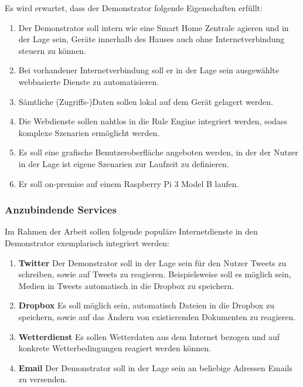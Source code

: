 Es wird erwartet, dass der Demonstrator folgende Eigenschaften erfüllt:
\begin{enumerate}

\item Der Demonstrator soll intern wie eine Smart Home Zentrale agieren und in der Lage sein, Geräte innerhalb des Hauses auch ohne Internetverbindung steuern zu können.
\item Bei vorhandener Internetverbindung soll er in der Lage sein ausgewählte  webbasierte Dienste zu automatisieren.
\item Sämtliche (Zugriffs-)Daten sollen lokal auf dem Gerät gelagert werden. 
\item Die Webdienste sollen nahtlos in die Rule Engine integriert werden, sodass komplexe Szenarien ermöglicht werden.
\item Es soll eine grafische Benutzeroberfläche angeboten werden, in der der Nutzer in der Lage ist eigene Szenarien zur Laufzeit zu definieren.
\item Er soll on-premise auf einem Raspberry Pi 3 Model B laufen.

\end{enumerate}

\subsubsection{Anzubindende Services}
\label{subsec:anzubindende_services}
Im Rahmen der Arbeit sollen folgende populäre Internetdienste in den Demonstrator exemplarisch integriert werden:
\begin{enumerate}
\item \textbf{Twitter}\cite{twitter} Der Demonstrator soll in der Lage sein für den Nutzer Tweets zu schreiben, sowie auf Tweets zu reagieren. Beispielsweise soll es möglich sein, Medien in Tweets automatisch in die Dropbox zu speichern.
\item \textbf{Dropbox}\cite{dropbox} Es soll möglich sein, automatisch Dateien in die Dropbox zu speichern, sowie auf das Ändern von existierenden Dokumenten zu reagieren.
\item \textbf{Wetterdienst}\cite{wetterapi} Es sollen Wetterdaten aus dem Internet bezogen und auf konkrete Wetterbedingungen reagiert werden können.
\item \textbf{Email} Der Demonstrator soll in der Lage sein an beliebige Adressen Emails zu versenden.
\end{enumerate}



